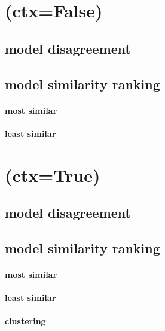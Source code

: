\documentclass{report}
\begin{document}
\section{(ctx=False)}

\subsection{model disagreement}

\vfill

\vfill


\subsection{model similarity ranking}
\paragraph{most similar}



\paragraph{least similar}



\section{(ctx=True)}
\subsection{model disagreement}

\vfill

\vfill


\subsection{model similarity ranking}

\paragraph{most similar}



\paragraph{least similar}




\paragraph{clustering}
% 
\end{document}
